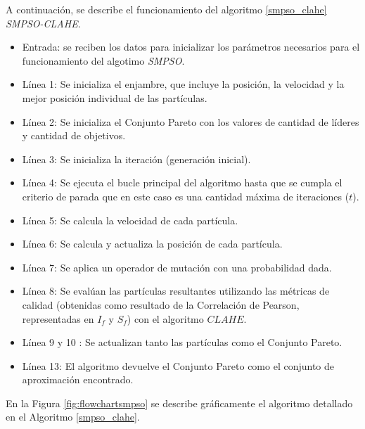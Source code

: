 A continuación, se describe el funcionamiento del algoritmo \ref{smpso_clahe} \textit{SMPSO-CLAHE}.
\begin{itemize}
\item Entrada: se reciben los datos para inicializar los parámetros necesarios para el funcionamiento del algotimo \textit{SMPSO}.
\item Línea 1: Se inicializa el enjambre, que incluye la posición, la velocidad y la mejor posición individual de las partículas.
\item Línea 2: Se inicializa el Conjunto Pareto con los valores de cantidad de líderes y cantidad de objetivos.
\item Línea 3: Se inicializa la iteración (generación inicial).
\item Línea 4: Se ejecuta el bucle principal del algoritmo hasta que se cumpla el criterio de parada que en este caso es una cantidad máxima de iteraciones ($t$).
\item Línea 5: Se calcula la velocidad de cada partícula.
\item Línea 6: Se calcula y actualiza la posición de cada partícula.
\item Línea 7: Se aplica un operador de mutación con una probabilidad dada.
\item Línea 8: Se evalúan las partículas resultantes utilizando las métricas de calidad (obtenidas como resultado de la Correlación  de Pearson, representadas en $I_f$ y $S_f$) con el algoritmo $CLAHE$.
\item Línea 9 y 10 : Se actualizan tanto las partículas como el Conjunto Pareto.
\item Línea 13: El algoritmo devuelve el Conjunto Pareto como el conjunto de aproximación encontrado.
\end{itemize}


En la Figura \ref{fig:flowchartsmpso} se describe gráficamente el algoritmo detallado en el Algoritmo \ref{smpso_clahe}. 

